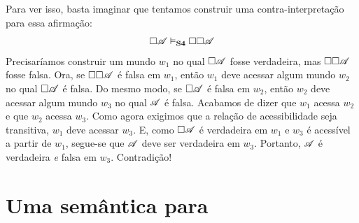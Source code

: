 Para ver isso, basta imaginar que tentamos construir uma contra-interpretação para essa afirmação:
\[\Box\mathscr{A} \vDash_{\mathbf{S4}} \Box \Box \mathscr{A}\]
Precisaríamos construir um mundo $w_1$ no qual $\Box\mathscr{A}$ fosse verdadeira, mas $\Box \Box \mathscr{A}$ fosse falsa. Ora, se $\Box \Box \mathscr{A}$ é falsa em $w_1$, então $w_1$ deve acessar algum mundo $w_2$ no qual $\Box\mathscr{A}$ é falsa. Do mesmo modo, se $\Box \mathscr{A}$ é falsa em $w_2$, então $w_2$ deve acessar algum mundo $w_3$ no qual $\mathscr{A}$ é falsa. Acabamos de dizer que $w_1$ acessa $w_2$ e que $w_2$ acessa $w_3$. Como agora exigimos que a relação de acessibilidade seja transitiva, $w_1$ deve acessar $w_3$. E, como $\Box\mathscr{A}$ é verdadeira em $w_1$ e $w_3$ é acessível a partir de $w_1$, segue-se que $\mathscr{A}$ deve ser verdadeira em $w_3$. Portanto, $\mathscr{A}$ é verdadeira \emph{e} falsa em $w_3$. Contradição!

\section{Uma semântica para \mlSfive}
\label{SemanticsS5}

